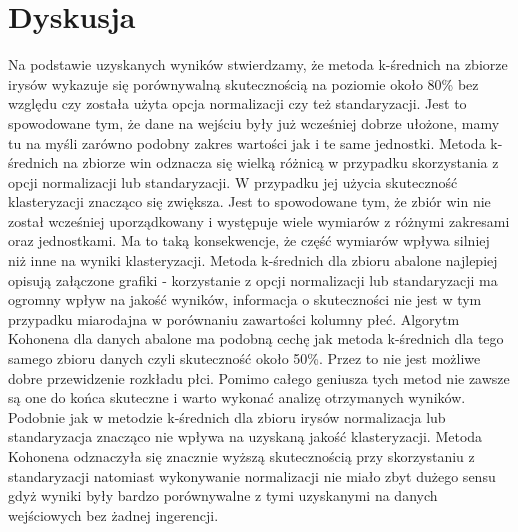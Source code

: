 \documentclass{classrep}
\begin{document}
    \section{Dyskusja}
    {
        Na podstawie uzyskanych wyników stwierdzamy, że metoda k-średnich na zbiorze irysów wykazuje się porównywalną
        skutecznością na poziomie około 80\% bez względu czy została użyta opcja normalizacji czy też standaryzacji.
    Jest to spowodowane tym, że dane na wejściu były już wcześniej dobrze ułożone, mamy tu na myśli zarówno podobny
    zakres wartości jak i te same jednostki. Metoda k-średnich na zbiorze win odznacza się wielką różnicą w przypadku
    skorzystania z opcji normalizacji lub standaryzacji. W przypadku jej użycia skuteczność klasteryzacji znacząco się
    zwiększa. Jest to spowodowane tym, że zbiór win nie został wcześniej uporządkowany i występuje wiele wymiarów z
    różnymi zakresami oraz jednostkami. Ma to taką konsekwencje, że część wymiarów wpływa silniej niż inne na wyniki
    klasteryzacji. Metoda k-średnich dla zbioru abalone najlepiej opisują załączone grafiki - korzystanie z opcji
    normalizacji lub standaryzacji ma ogromny wpływ na jakość wyników, informacja o skuteczności nie jest w tym przypadku
    miarodajna w porównaniu zawartości kolumny płeć. Algorytm Kohonena dla danych abalone ma podobną cechę jak metoda
    k-średnich dla tego samego zbioru danych czyli skuteczność około 50\%. Przez to nie jest możliwe dobre przewidzenie
    rozkładu płci. Pomimo całego geniusza tych metod nie zawsze są one do końca skuteczne i warto wykonać analizę
    otrzymanych wyników. Podobnie jak w metodzie k-średnich dla zbioru irysów normalizacja lub standaryzacja znacząco
    nie wpływa na uzyskaną jakość klasteryzacji. Metoda Kohonena odznaczyła się znacznie wyższą skutecznością przy
    skorzystaniu z standaryzacji natomiast wykonywanie normalizacji nie miało zbyt dużego sensu gdyż wyniki były bardzo
    porównywalne z tymi uzyskanymi na danych wejściowych bez żadnej ingerencji.\\

}
\end{document}
